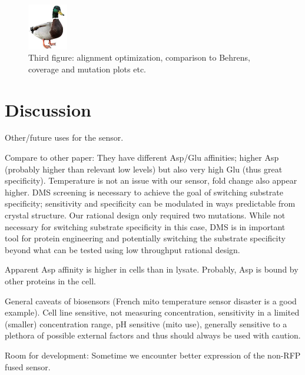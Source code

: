 \documentclass[9pt,lineno]{elife}
\begin{document}
\begin{figure}[ht!]
\centering
\includegraphics[height=2cm]{figures/duck.jpg}
\caption{
Third figure: alignment optimization, comparison to Behrens, coverage and mutation plots etc.
}
\label{fig:fig3}
\end{figure}














\section{Discussion}
Other/future uses for the sensor.

Compare to other paper:
They have different Asp/Glu affinities; higher Asp (probably higher than relevant low levels) but also very high Glu (thus great specificity). Temperature is not an issue with our sensor, fold change also appear higher.
DMS screening is necessary to achieve the goal of switching substrate specificity; sensitivity and specificity can be modulated in ways predictable from crystal structure. Our rational design only required two mutations. While not necessary for switching substrate specificity in this case, DMS is in important tool for protein engineering and potentially switching the substrate specificity beyond what can be tested using low throughput rational design.

Apparent Asp affinity is higher in cells than in lysate. Probably, Asp is bound by other proteins in the cell.

General caveats of biosensors (French mito temperature sensor disaster is a good example). Cell line sensitive, not measuring concentration, sensitivity in a limited (smaller) concentration range, pH sensitive (mito use), generally sensitive to a plethora of possible external factors and thus should always be used with caution.

Room for development:
Sometime we encounter better expression of the non-RFP fused sensor.
\end{document}
